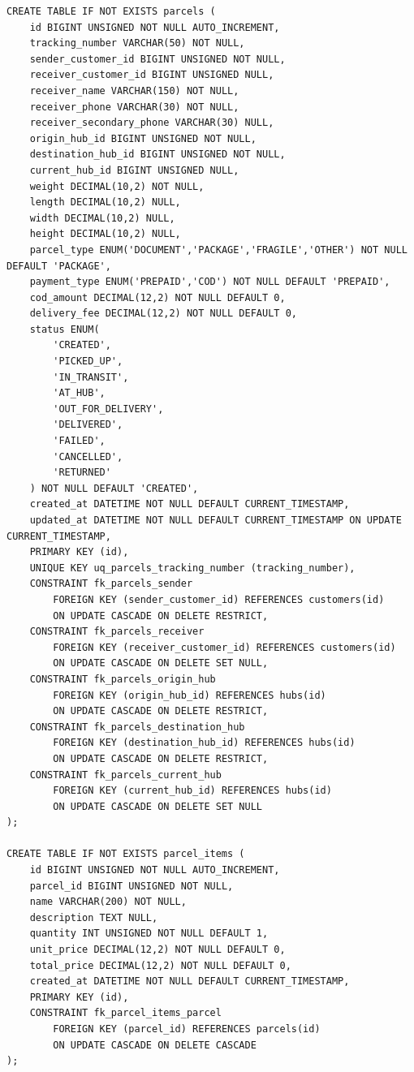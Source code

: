 \documentclass[11pt,a4paper]{article}
\begin{document}
\begin{lstlisting}
CREATE TABLE IF NOT EXISTS parcels (
    id BIGINT UNSIGNED NOT NULL AUTO_INCREMENT,
    tracking_number VARCHAR(50) NOT NULL,
    sender_customer_id BIGINT UNSIGNED NOT NULL,
    receiver_customer_id BIGINT UNSIGNED NULL,
    receiver_name VARCHAR(150) NOT NULL,
    receiver_phone VARCHAR(30) NOT NULL,
    receiver_secondary_phone VARCHAR(30) NULL,
    origin_hub_id BIGINT UNSIGNED NOT NULL,
    destination_hub_id BIGINT UNSIGNED NOT NULL,
    current_hub_id BIGINT UNSIGNED NULL,
    weight DECIMAL(10,2) NOT NULL,
    length DECIMAL(10,2) NULL,
    width DECIMAL(10,2) NULL,
    height DECIMAL(10,2) NULL,
    parcel_type ENUM('DOCUMENT','PACKAGE','FRAGILE','OTHER') NOT NULL DEFAULT 'PACKAGE',
    payment_type ENUM('PREPAID','COD') NOT NULL DEFAULT 'PREPAID',
    cod_amount DECIMAL(12,2) NOT NULL DEFAULT 0,
    delivery_fee DECIMAL(12,2) NOT NULL DEFAULT 0,
    status ENUM(
        'CREATED',
        'PICKED_UP',
        'IN_TRANSIT',
        'AT_HUB',
        'OUT_FOR_DELIVERY',
        'DELIVERED',
        'FAILED',
        'CANCELLED',
        'RETURNED'
    ) NOT NULL DEFAULT 'CREATED',
    created_at DATETIME NOT NULL DEFAULT CURRENT_TIMESTAMP,
    updated_at DATETIME NOT NULL DEFAULT CURRENT_TIMESTAMP ON UPDATE CURRENT_TIMESTAMP,
    PRIMARY KEY (id),
    UNIQUE KEY uq_parcels_tracking_number (tracking_number),
    CONSTRAINT fk_parcels_sender
        FOREIGN KEY (sender_customer_id) REFERENCES customers(id)
        ON UPDATE CASCADE ON DELETE RESTRICT,
    CONSTRAINT fk_parcels_receiver
        FOREIGN KEY (receiver_customer_id) REFERENCES customers(id)
        ON UPDATE CASCADE ON DELETE SET NULL,
    CONSTRAINT fk_parcels_origin_hub
        FOREIGN KEY (origin_hub_id) REFERENCES hubs(id)
        ON UPDATE CASCADE ON DELETE RESTRICT,
    CONSTRAINT fk_parcels_destination_hub
        FOREIGN KEY (destination_hub_id) REFERENCES hubs(id)
        ON UPDATE CASCADE ON DELETE RESTRICT,
    CONSTRAINT fk_parcels_current_hub
        FOREIGN KEY (current_hub_id) REFERENCES hubs(id)
        ON UPDATE CASCADE ON DELETE SET NULL
);

CREATE TABLE IF NOT EXISTS parcel_items (
    id BIGINT UNSIGNED NOT NULL AUTO_INCREMENT,
    parcel_id BIGINT UNSIGNED NOT NULL,
    name VARCHAR(200) NOT NULL,
    description TEXT NULL,
    quantity INT UNSIGNED NOT NULL DEFAULT 1,
    unit_price DECIMAL(12,2) NOT NULL DEFAULT 0,
    total_price DECIMAL(12,2) NOT NULL DEFAULT 0,
    created_at DATETIME NOT NULL DEFAULT CURRENT_TIMESTAMP,
    PRIMARY KEY (id),
    CONSTRAINT fk_parcel_items_parcel
        FOREIGN KEY (parcel_id) REFERENCES parcels(id)
        ON UPDATE CASCADE ON DELETE CASCADE
);


\end{lstlisting}
\end{document}
